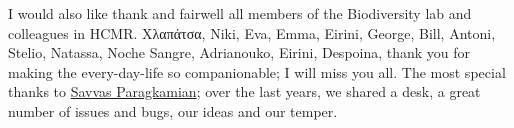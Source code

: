\documentclass[master=elt, cleveref, autoref, masteroption=eg]{kulemt}
\begin{document}
\begin{preface}
   I would also like thank and fairwell all members of the Biodiversity lab and colleagues in HCMR. 
   \foreignlanguage{greek}{Χλαπάτσα}, Niki, Eva, Emma, Eirini, George, Bill, Antoni, Stelio, Natassa, Noche Sangre, Adrianouko, Eirini, Despoina, 
   thank you for making the every-day-life so companionable; I will miss you all.
   The most special thanks to 
   \href{https://www.researchgate.net/profile/Savvas-Paragkamian-2}{Savvas Paragkamian};
   over the last years, we shared a desk, a great number of issues and bugs, our ideas and our temper.





\end{preface}
\end{document}
